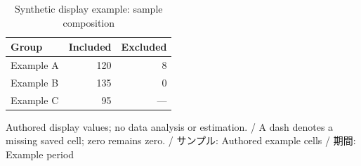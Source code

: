 \begin{table}[htbp]
\centering
\begin{tabular}{lrr}
\hline
Group & Included & Excluded \\
\hline
Example A & 120 & 8 \\
Example B & 135 & 0 \\
Example C & 95 & — \\
\hline
\end{tabular}
\caption{Synthetic display example: sample composition}
\par\small Authored display values; no data analysis or estimation. / A dash denotes a missing saved cell; zero remains zero. / サンプル: Authored example cells / 期間: Example period
\end{table}
